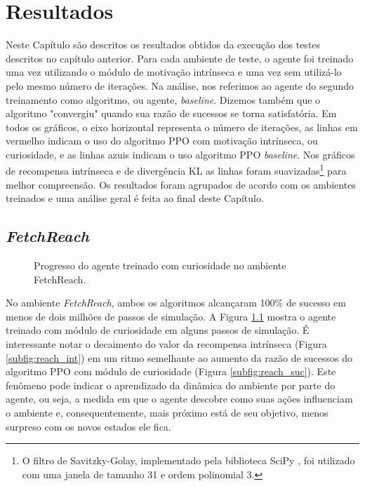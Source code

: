 \chapter{Resultados}
\label{cap:resultados}

Neste Capítulo são descritos os resultados obtidos da execução dos testes descritos no capítulo anterior. Para cada ambiente de teste, o agente foi treinado uma vez utilizando o módulo de motivação intrínseca e uma vez sem utilizá-lo pelo mesmo número de iterações. Na análise, nos referimos ao agente do segundo treinamento como algoritmo, ou agente, \textit{baseline}. Dizemos também que o algoritmo "convergiu" quando sua razão de sucessos se torna satisfatória. Em todos os gráficos, o eixo horizontal representa o número de iterações, as linhas em vermelho indicam o uso do algoritmo PPO com motivação intrínseca, ou curiosidade, e as linhas azuis indicam o uso algoritmo PPO \textit{baseline}. Nos gráficos de recompensa intrínseca e de divergência KL as linhas foram suavizadas\footnote{O filtro de Savitzky-Golay, implementado pela biblioteca SciPy \cite{scipy}, foi utilizado com uma janela de tamanho 31 e ordem polinomial 3.} para melhor compreensão. Os resultados foram agrupados de acordo com os ambientes treinados e uma análise geral é feita ao final deste Capítulo.

\section{\textit{FetchReach}}
\label{sec:reach}

\begin{figure}[h!]
 \centering
   \captionsetup{width=1\textwidth}
   \caption{Progresso do agente treinado com curiosidade no ambiente FetchReach.}
  \label{fig:reach_ex}
\end{figure}

No ambiente \textit{FetchReach}, ambos os algoritmos alcançaram 100\% de sucesso em menos de dois milhões de passos de simulação. A Figura \ref{fig:reach_ex} mostra o agente treinado com módulo de curiosidade em alguns passos de simulação. É interessante notar o decaimento do valor da recompensa intrínseca (Figura \ref{subfig:reach_int}) em um ritmo semelhante ao aumento da razão de sucessos do algoritmo PPO com módulo de curiosidade (Figura \ref{subfig:reach_suc}). Este fenômeno pode indicar o aprendizado da dinâmica do ambiente por parte do agente, ou seja, a medida em que o agente descobre como suas ações influenciam o ambiente e, consequentemente, mais próximo está de seu objetivo, menos surpreso com os novos estados ele fica.

